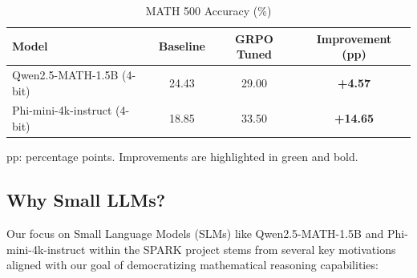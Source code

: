 \documentclass[11pt]{article}
\begin{document}
\begin{itemize}
\begin{table}[htbp]
    \vspace{1em} %
    
    \begin{subtable}{\linewidth}
    \centering
    \caption{MATH 500 Accuracy (\%)}
    \begin{tabular}{@{}l
                    S[table-format=2.2]
                    S[table-format=2.2]
                    S[table-format=2.2, color=improvementgreen, detect-weight]
                    @{}}
    \toprule
    \textbf{Model} & {Baseline} & {GRPO Tuned} & {Improvement (pp)} \\
    \midrule
    Qwen2.5-MATH-1.5B (4-bit)     & 24.43 & 29.00 & \bfseries +4.57 \\
    Phi-mini-4k-instruct (4-bit)  & 18.85 & 33.50 & \bfseries +14.65 \\
    \bottomrule
    \end{tabular}
    \end{subtable}
    
    \vspace{0.5em}
    \footnotesize\raggedright
    pp: percentage points. Improvements are highlighted in \textcolor{improvementgreen}{green} and bold.
    \end{table}


\subsection{Why Small LLMs?} %
Our focus on Small Language Models (SLMs) like Qwen2.5-MATH-1.5B and Phi-mini-4k-instruct within the SPARK project stems from several key motivations aligned with our goal of democratizing mathematical reasoning capabilities:


\end{itemize}
\end{document}
